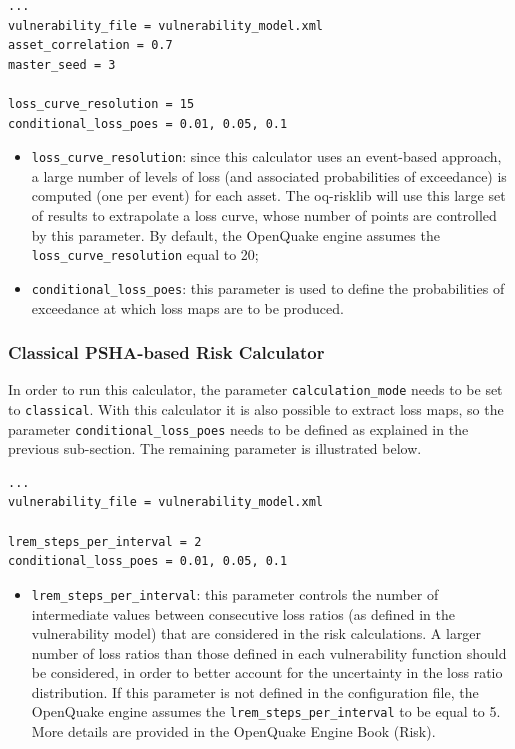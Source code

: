 \begin{Verbatim}[frame=single, commandchars=\\\{\}, samepage=true]
...
vulnerability_file = vulnerability_model.xml
asset_correlation = 0.7
master_seed = 3

loss_curve_resolution = 15
conditional_loss_poes = 0.01, 0.05, 0.1
\end{Verbatim}

\begin{itemize}
\item  \Verb+loss_curve_resolution+: since this calculator uses an event-based approach, a large number of levels of loss (and associated probabilities of exceedance) is computed (one per event) for each asset. The oq-risklib will use this large set of results to extrapolate a loss curve, whose number of points are controlled by this parameter. By default, the OpenQuake engine assumes the \Verb+loss_curve_resolution+ equal to 20;
\item  \Verb+conditional_loss_poes+: this parameter is used to define the probabilities of exceedance at which loss maps are to be produced.
\end{itemize}

\subsubsection{Classical PSHA-based Risk Calculator}
In order to run this calculator, the parameter \Verb+calculation_mode+ needs to be set to \Verb+classical+. With this calculator it is also possible to extract loss maps, so the parameter \Verb+conditional_loss_poes+ needs to be defined as explained in the previous sub-section. The remaining parameter is illustrated below.
\begin{Verbatim}[frame=single, commandchars=\\\{\}, samepage=true]
...
vulnerability_file = vulnerability_model.xml

lrem_steps_per_interval = 2
conditional_loss_poes = 0.01, 0.05, 0.1
\end{Verbatim}

\begin{itemize}
\item  \Verb+lrem_steps_per_interval+: this parameter controls the number of intermediate values between consecutive loss ratios (as defined in the \gls{vulnerability model}) that are considered in the risk calculations. A larger number of loss ratios than those defined in each \gls{vulnerability function} should be considered, in order to better account for the uncertainty in the loss ratio distribution. If this parameter is not defined in the configuration file, the OpenQuake engine assumes the \Verb+lrem_steps_per_interval+ to be equal to 5. More details are provided in the OpenQuake Engine Book (Risk).  
\end{itemize}

